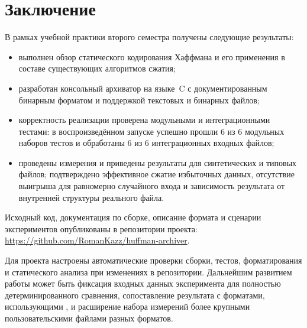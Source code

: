 
\section*{Заключение}

В рамках учебной практики второго семестра получены следующие результаты:
\begin{itemize}
    \item выполнен обзор статического кодирования Хаффмана и его применения в
          составе существующих алгоритмов сжатия;
    \item разработан консольный архиватор на языке~C с документированным
          бинарным форматом и поддержкой текстовых и бинарных файлов;
    \item корректность реализации проверена модульными и интеграционными
          тестами: в воспроизведённом запуске успешно прошли 6 из 6 модульных
          наборов тестов и обработаны 6 из 6 интеграционных входных файлов;
    \item проведены измерения и приведены результаты для синтетических и
          типовых файлов; подтверждено эффективное сжатие избыточных данных,
          отсутствие выигрыша для равномерно случайного входа и зависимость
          результата от внутренней структуры реального файла.
\end{itemize}

Исходный код, документация по сборке, описание формата и сценарии экспериментов
опубликованы в репозитории проекта:
\url{https://github.com/RomanKazz/huffman-archiver}.

Для проекта настроены автоматические проверки сборки, тестов, форматирования и
статического анализа при изменениях в репозитории. Дальнейшим развитием работы
может быть фиксация входных данных эксперимента для полностью детерминированного
сравнения, сопоставление результата с форматами, использующими \Deflate{}, и
расширение набора измерений более крупными пользовательскими файлами разных
форматов.
